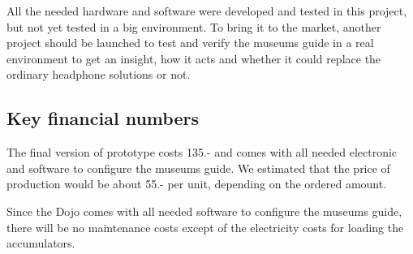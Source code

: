 All the needed hardware and software were developed and tested in this project, but not yet tested in a big environment. To bring it to the market, another project should be launched to test and verify the museums guide in a real environment to get an insight, how it acts and whether it could replace the ordinary headphone solutions or not.

\subsection*{Key financial numbers}

The final version of prototype costs 135.- and comes with all needed electronic and software to configure the museums guide. We estimated that the price of production would be about 55.- per unit, depending on the ordered amount.

Since the Dojo comes with all needed software to configure the museums guide, there will be no maintenance costs except of the electricity costs for loading the accumulators.